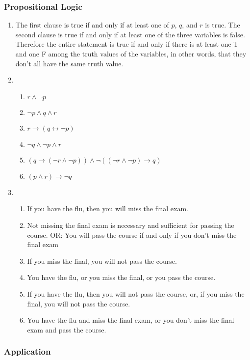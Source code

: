 \documentclass{sig-alternate-05-2015}
\begin{document}
\subsubsection{Propositional Logic}
\begin{enumerate}

\item The first clause is true if and only if at least one of $p$, $q$, and
$r$ is true. The second clause is true if and only if at least one of
the three variables is false. Therefore the entire statement is
true if and only if there is at least one T and one F among the
truth values of the variables, in other words, that they don\textquoteright t all
have the same truth value.
\item
\begin{enumerate}
\item $r \wedge \neg  p$
\item $\neg p \wedge q\wedge r$
\item $r \rightarrow (q \leftrightarrow \neg p) $
\item $\neg q \wedge \neg p \wedge r$
\item $(q \rightarrow (\neg r\wedge \neg p))\wedge \neg((\neg r \wedge \neg p) \rightarrow q)$
\item $(p \wedge r) \rightarrow \neg q$
\end{enumerate}
\item
\begin{enumerate}
	\item If you have the flu, then you will miss the final exam.

	\item Not missing the final exam is necessary and sufficient for passing the course. OR: You
	will pass the course if and only if you don't miss the final exam
	\item If you miss the final, you will not pass the course.
	\item You have the flu, or you miss the final, or you pass the course.
	\item If you have the flu, then you will not pass the course, or, if you miss the final, you will
	not pass the course.
	\item You have the flu and miss the final exam, or you don't miss the final exam and pass
	the course.

\end{enumerate}
\end{enumerate}

\subsubsection{Application}
\end{document}
